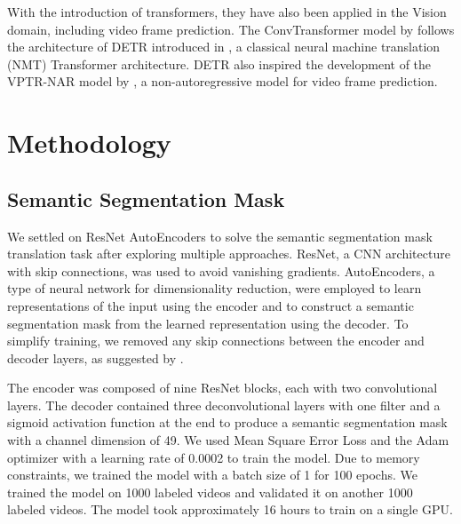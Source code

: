 \documentclass{article}
\begin{document}
With the introduction of transformers, they have also been applied in the Vision domain, 
including video frame prediction. The ConvTransformer model by \citet{Liu2020ConvTransformerAC} 
follows the architecture of DETR introduced in \citet{Meinhardt2021TrackFormerMT}, a classical 
neural machine translation (NMT) Transformer architecture. DETR also inspired the development 
of the VPTR-NAR model by \citet{Ye2022VPTRET}, a non-autoregressive model for video frame 
prediction.

\section{Methodology}
\subsection{Semantic Segmentation Mask}
We settled on ResNet AutoEncoders to solve the semantic segmentation mask translation task after 
exploring multiple approaches. ResNet, a CNN architecture with skip connections, was used to 
avoid vanishing gradients. AutoEncoders, a type of neural network for dimensionality reduction,
were employed to learn representations of the input using the encoder and to construct a 
semantic segmentation mask from the learned representation using the decoder. To simplify 
training, we removed any skip connections between the encoder and decoder layers, as suggested 
by \citet{Ye2022VPTRET}.

The encoder was composed of nine ResNet blocks, each with two convolutional layers. The decoder 
contained three deconvolutional layers with one filter and a sigmoid activation function at the 
end to produce a semantic segmentation mask with a channel dimension of 49. We used Mean Square 
Error Loss and the Adam optimizer with a learning rate of 0.0002 to train the model. Due to 
memory constraints, we trained the model with a batch size of 1 for 100 epochs. We trained the 
model on 1000 labeled videos and validated it on another 1000 labeled videos. The model took 
approximately 16 hours to train on a single GPU.
\end{document}
